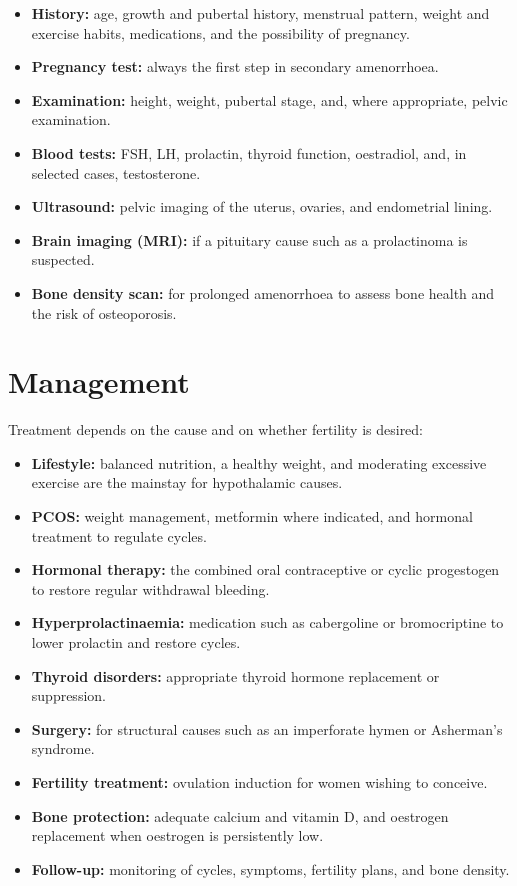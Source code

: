 \begin{itemize}
    \item \textbf{History:} age, growth and pubertal history, menstrual pattern, weight and exercise habits, medications, and the possibility of pregnancy.
    \item \textbf{Pregnancy test:} always the first step in secondary amenorrhoea.
    \item \textbf{Examination:} height, weight, pubertal stage, and, where appropriate, pelvic examination.
    \item \textbf{Blood tests:} FSH, LH, prolactin, thyroid function, oestradiol, and, in selected cases, testosterone.
    \item \textbf{Ultrasound:} pelvic imaging of the uterus, ovaries, and endometrial lining.
    \item \textbf{Brain imaging (MRI):} if a pituitary cause such as a prolactinoma is suspected.
    \item \textbf{Bone density scan:} for prolonged amenorrhoea to assess bone health and the risk of osteoporosis.
\end{itemize}

\section*{Management}
Treatment depends on the cause and on whether fertility is desired:

\begin{itemize}
    \item \textbf{Lifestyle:} balanced nutrition, a healthy weight, and moderating excessive exercise are the mainstay for hypothalamic causes.
    \item \textbf{PCOS:} weight management, metformin where indicated, and hormonal treatment to regulate cycles.
    \item \textbf{Hormonal therapy:} the combined oral contraceptive or cyclic progestogen to restore regular withdrawal bleeding.
    \item \textbf{Hyperprolactinaemia:} medication such as cabergoline or bromocriptine to lower prolactin and restore cycles.
    \item \textbf{Thyroid disorders:} appropriate thyroid hormone replacement or suppression.
    \item \textbf{Surgery:} for structural causes such as an imperforate hymen or Asherman's syndrome.
    \item \textbf{Fertility treatment:} ovulation induction for women wishing to conceive.
    \item \textbf{Bone protection:} adequate calcium and vitamin D, and oestrogen replacement when oestrogen is persistently low.
    \item \textbf{Follow-up:} monitoring of cycles, symptoms, fertility plans, and bone density.
\end{itemize}


